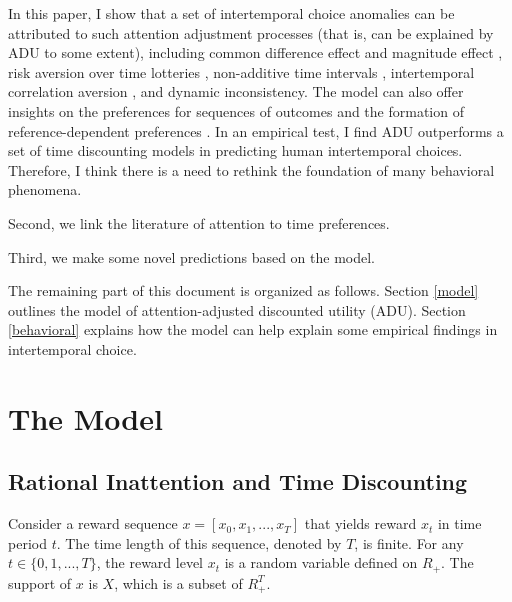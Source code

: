 \documentclass[
  12pt,
]{article}
\begin{document}
In this paper, I show that a set of intertemporal choice anomalies can
be attributed to such attention adjustment processes (that is, can be
explained by ADU to some extent), including common difference effect and
magnitude effect \citep{loewenstein_anomalies_1992}, risk aversion over
time lotteries \citep{onay_intertemporal_2007, dejarnette_time_2020},
non-additive time intervals
\citep{read_is_2001, scholten_discounting_2006}, intertemporal
correlation aversion \citep{andersen_multiattribute_2018}, and dynamic
inconsistency. The model can also offer insights on the preferences for
sequences of outcomes \citep{loewenstein_preferences_1993} and the
formation of reference-dependent preferences \citep{koszegi_model_2006}.
In an empirical test, I find ADU outperforms a set of time discounting
models in predicting human intertemporal choices. Therefore, I think
there is a need to rethink the foundation of many behavioral phenomena.

Second, we link the literature of attention to time preferences.

Third, we make some novel predictions based on the model.

The remaining part of this document is organized as follows. Section
\ref{model} outlines the model of attention-adjusted discounted utility
(ADU). Section \ref{behavioral} explains how the model can help explain
some empirical findings in intertemporal choice.

\hypertarget{the-model}{%
\section{\texorpdfstring{The Model
\label{model}}{The Model }}\label{the-model}}

\hypertarget{rational-inattention-and-time-discounting}{%
\subsection{Rational Inattention and Time
Discounting}\label{rational-inattention-and-time-discounting}}

Consider a reward sequence \(x = [x_0,x_1,...,x_T]\) that yields reward
\(x_t\) in time period \(t\). The time length of this sequence, denoted
by \(T\), is finite. For any \(t \in \{0,1,...,T\}\), the reward level
\(x_t\) is a random variable defined on \(R_{+}\). The support of \(x\)
is \(X\), which is a subset of \(R_{+}^T\).
\end{document}
